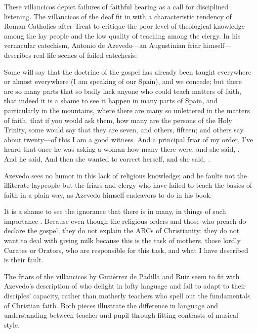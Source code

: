 These villancicos depict failures of faithful hearing as a call for disciplined
listening.
The villancicos of the deaf fit in with a characteristic tendency of Roman
Catholics after Trent to critique the poor level of theological knowledge among
the lay people and the low quality of teaching among the clergy.%
    \Autocite[56--57]{Kamen:EarlyModernSociety}
In his vernacular catechism, Antonio de Azevedo---an Augustinian friar
himself--- describes real-life scenes of failed catechesis: 
\begin{quoting}
    Some will say that the doctrine of the gospel has already been taught
    everywhere or almost everywhere (I am speaking of our Spain), and we
    concede; but there are so many parts that so badly lack anyone who could
    teach matters of faith, that indeed it is a shame to see it happen in many
    parts of Spain, and particularly in the mountains, where there are many so
    unlettered  in the matters of faith, that if you would ask
    them, how many are the persons of the Holy Trinity, some would say that they
    are seven, and others, fifteen; and others say about twenty---of this I am a
    good witness.
    And a principal friar of my order, I've heard that once he was asking a
    woman how many  there were, and she said,
    . 
    And he said,  
    And then she wanted to correct herself, and she said, .%
        \Autocite[26]{Azevedo:Catecismo}
\end{quoting}
Azevedo sees no humor in this lack of religious knowledge; and he faults not the
illiterate laypeople but the friars and clergy who have failed to teach the
basics of faith in a plain way, as Azevedo himself endeavors to do in his book:
\begin{quoting}
    It is a shame to see the ignorance that there is in many, in things of such
    importance \Dots{}.
    Because even though the religious orders and those who preach do declare the
    gospel, they do not explain the ABCs  of Christianity;
    they do not want to deal with giving milk because this is the task of
    mothers, those lordly Curates or Orators, who are responsible for this task,
    and what I have described is their fault.%
        \Autocite[27]{Azevedo:Catecismo}
\end{quoting}
The friars of the villancicos by Gutiérrez de Padilla and Ruiz seem to fit
with Azevedo's description of  who delight in lofty
language and fail to adapt to their disciples' capacity, rather than motherly
teachers who spell out the fundamentals of Christian faith.
Both pieces illustrate the difference in language and understanding between
teacher and pupil through fitting contrasts of musical style.

